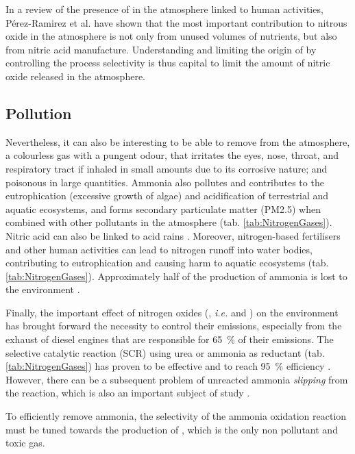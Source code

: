 In a review of the presence of  in the atmosphere linked to human activities, Pérez-Ramirez et al. \parencite*{PerezRamirez2003} have shown that the most important contribution to nitrous oxide in the atmosphere is not only from unused volumes of nutrients, but also from nitric acid manufacture.
Understanding and limiting the origin of  by controlling the process selectivity is thus capital to limit the amount of nitric oxide released in the atmosphere.

\subsection{Pollution}

Nevertheless, it can also be interesting to be able to remove  from the atmosphere, a colourless gas with a pungent odour, that irritates the eyes, nose, throat, and respiratory tract if inhaled in small amounts due to its corrosive nature; and poisonous in large quantities.
Ammonia also pollutes and contributes to the eutrophication (excessive growth of algae) and acidification of terrestrial and aquatic ecosystems, and forms secondary particulate matter (PM2.5) when combined with other pollutants in the atmosphere (tab. \ref{tab:NitrogenGases}).
Nitric acid can also be linked to acid rains \parencite{Galloway1981}.
Moreover, nitrogen-based fertilisers and other human activities can lead to nitrogen runoff into water bodies, contributing to eutrophication and causing harm to aquatic ecosystems (tab. \ref{tab:NitrogenGases}).
Approximately half of the production of ammonia is lost to the environment \parencite{Erisman2007}.

Finally, the important effect of nitrogen oxides (, \textit{i.e.}  and ) on the environment has brought forward the necessity to control their emissions, especially from the exhaust of diesel engines that are responsible for \qty{65}{\percent} of their emissions.
The selective catalytic reaction (SCR) using urea or ammonia as reductant (tab. \ref{tab:NitrogenGases}) has proven to be effective and to reach \qty{95}{\percent} efficiency \parencite{MitsubishiSCR}.
However, there can be a subsequent problem of unreacted ammonia \textit{slipping} from the reaction, which is also an important subject of study \parencite{Thermofischer}.

To efficiently remove ammonia, the selectivity of the ammonia oxidation reaction must be tuned towards the production of , which is the only non pollutant and toxic gas.

